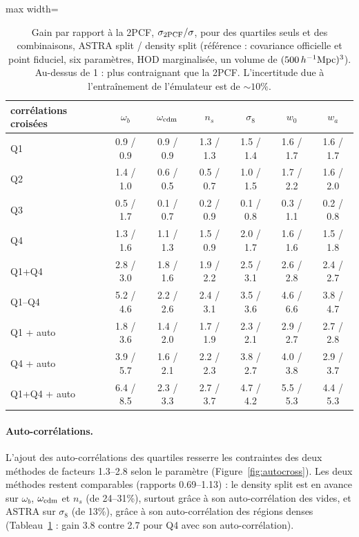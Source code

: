 \begin{table}[!tp]
\centering\small
\begin{adjustbox}{max width=\textwidth}
\begin{tabular}{lcccccc}
\toprule
corrélations croisées & $\omega_b$ & $\omega_{\rm cdm}$ & $n_s$ & $\sigma_8$ & $w_0$ & $w_a$ \\
\midrule
Q1 & 0.9 / 0.9 & 0.9 / 0.9 & 1.3 / 1.3 & 1.5 / 1.4 & 1.6 / 1.7 & 1.6 / 1.7 \\
Q2 & 1.4 / 1.0 & 0.6 / 0.5 & 0.5 / 0.7 & 1.0 / 1.5 & 1.7 / 2.2 & 1.6 / 2.0 \\
Q3 & 0.5 / 1.7 & 0.1 / 0.7 & 0.2 / 0.9 & 0.1 / 0.8 & 0.3 / 1.1 & 0.2 / 0.8 \\
Q4 & 1.3 / 1.6 & 1.1 / 1.3 & 1.5 / 0.9 & 2.0 / 1.7 & 1.6 / 1.6 & 1.5 / 1.8 \\
Q1+Q4 & 2.8 / 3.0 & 1.8 / 1.6 & 1.9 / 2.2 & 2.5 / 3.1 & 2.6 / 2.8 & 2.4 / 2.7 \\
Q1--Q4 & 5.2 / 4.6 & 2.2 / 2.6 & 2.4 / 3.1 & 3.5 / 3.6 & 4.6 / 6.6 & 3.8 / 4.7 \\
Q1 + auto & 1.8 / 3.6 & 1.4 / 2.0 & 1.7 / 1.9 & 2.3 / 2.1 & 2.9 / 2.7 & 2.7 / 2.8 \\
Q4 + auto & 3.9 / 5.7 & 1.6 / 2.1 & 2.2 / 2.3 & 3.8 / 2.7 & 4.0 / 3.8 & 2.9 / 3.7 \\
Q1+Q4 + auto & 6.4 / 8.5 & 2.3 / 3.3 & 2.7 / 3.7 & 4.7 / 4.2 & 5.5 / 5.3 & 4.4 / 5.3 \\
\bottomrule
\end{tabular}
\end{adjustbox}
\caption{Gain par rapport à la 2PCF, $\sigma_{\rm 2PCF}/\sigma$, pour des quartiles seuls et des combinaisons, ASTRA split / density split (référence : covariance officielle et point fiduciel, six paramètres, HOD marginalisée, un volume de $(500\,h^{-1}\mathrm{Mpc})^3$). Au-dessus de 1 : plus contraignant que la 2PCF. L'incertitude due à l'entraînement de l'émulateur est de $\sim10\%$.}
\label{tab:breakdown}
\end{table}

\paragraph{Auto-corrélations.} L'ajout des auto-corrélations des quartiles resserre les contraintes des deux méthodes de facteurs 1.3--2.8 selon le paramètre (Figure~\ref{fig:autocross}). Les deux méthodes restent comparables (rapports 0.69--1.13) : le density split est en avance sur $\omega_b$, $\omega_{\rm cdm}$ et $n_s$ (de 24--31\%), surtout grâce à son auto-corrélation des vides, et ASTRA sur $\sigma_8$ (de 13\%), grâce à son auto-corrélation des régions denses (Tableau~\ref{tab:breakdown} : gain 3.8 contre 2.7 pour Q4 avec son auto-corrélation).

